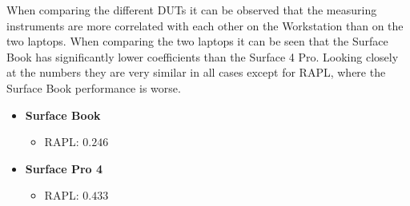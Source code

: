 When comparing the different DUTs it can be observed that the measuring instruments are more correlated with each other on the Workstation than on the two laptops. When comparing the two laptops it can be seen that the Surface Book has significantly lower coefficients than the Surface 4 Pro. Looking closely at the numbers they are very similar in all cases except for RAPL, where the Surface Book performance is worse.

\begin{itemize}
    \item \textbf{Surface Book}
    \begin{itemize}
        \item RAPL: $0.246$
    \end{itemize}
    \item \textbf{Surface Pro 4}
    \begin{itemize}
        \item RAPL: $0.433$
    \end{itemize}
\end{itemize}










